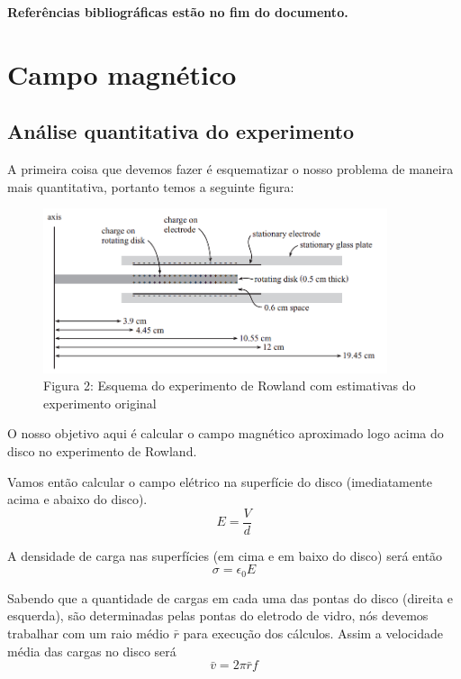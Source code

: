 \documentclass[12pt, letterpaper]{article}
\begin{document}
    \textbf{Referências bibliográficas estão no fim do documento.}

\newpage
\section {Campo magnético}
    \subsection{Análise quantitativa do experimento}
	A primeira coisa que devemos fazer é esquematizar o nosso problema de maneira mais quantitativa, portanto temos a seguinte figura:

	\begin{figure}[h]
        \centering
        \includegraphics[width=0.9\textwidth]{rowland_diagram}
        \\{Figura 2: Esquema do experimento de Rowland com estimativas do experimento original}
        \label{fig:rowland_diagram}
    \end{figure}

    O nosso objetivo aqui é calcular o campo magnético aproximado logo acima do disco no experimento de Rowland.

    Vamos então calcular o campo elétrico na superfície do disco (imediatamente acima e abaixo do disco).
    \begin{equation} \label{e_field}
    	E = \frac{V}{d}
    \end{equation}

    A densidade de carga nas superfícies (em cima e em baixo do disco) será então
    \begin{equation} \label{q_density}
    	\sigma = \epsilon_0 E
    \end{equation}

    Sabendo que a quantidade de cargas em cada uma das pontas do disco (direita e esquerda), são determinadas pelas pontas do eletrodo de vidro, nós devemos trabalhar com um raio médio $\bar{r}$ para execução dos cálculos. Assim a velocidade média das cargas no disco será
    \begin{equation} \label{avg_v}
    	\bar{v} = 2\pi\bar{r}f
    \end{equation}
\end{document}
